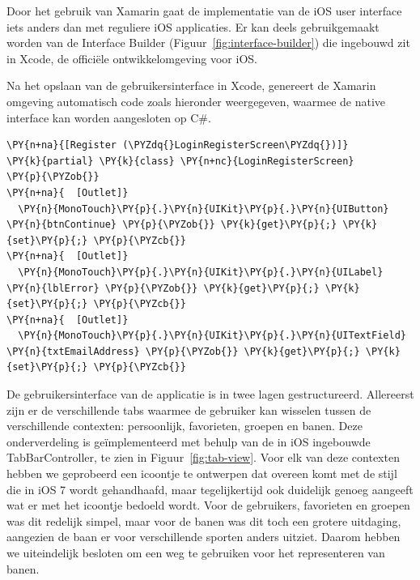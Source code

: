 Door het gebruik van Xamarin gaat de implementatie van de iOS user interface iets anders dan met reguliere iOS applicaties. Er kan deels gebruikgemaakt worden van de Interface Builder (Figuur~\ref{fig:interface-builder}) die ingebouwd zit in Xcode, de officiële ontwikkelomgeving voor iOS.

Na het opslaan van de gebruikersinterface in Xcode, genereert de Xamarin omgeving automatisch code zoals hieronder weergegeven, waarmee de native interface kan worden aangesloten op C\#.



\begin{Verbatim}[commandchars=\\\{\}]
\PY{n+na}{[Register (\PYZdq{}LoginRegisterScreen\PYZdq{})]}
\PY{k}{partial} \PY{k}{class} \PY{n+nc}{LoginRegisterScreen}
\PY{p}{\PYZob{}}
\PY{n+na}{  [Outlet]}
  \PY{n}{MonoTouch}\PY{p}{.}\PY{n}{UIKit}\PY{p}{.}\PY{n}{UIButton} \PY{n}{btnContinue} \PY{p}{\PYZob{}} \PY{k}{get}\PY{p}{;} \PY{k}{set}\PY{p}{;} \PY{p}{\PYZcb{}}
\PY{n+na}{  [Outlet]}
  \PY{n}{MonoTouch}\PY{p}{.}\PY{n}{UIKit}\PY{p}{.}\PY{n}{UILabel} \PY{n}{lblError} \PY{p}{\PYZob{}} \PY{k}{get}\PY{p}{;} \PY{k}{set}\PY{p}{;} \PY{p}{\PYZcb{}}
\PY{n+na}{  [Outlet]}
  \PY{n}{MonoTouch}\PY{p}{.}\PY{n}{UIKit}\PY{p}{.}\PY{n}{UITextField} \PY{n}{txtEmailAddress} \PY{p}{\PYZob{}} \PY{k}{get}\PY{p}{;} \PY{k}{set}\PY{p}{;} \PY{p}{\PYZcb{}}
\end{Verbatim}

De gebruikersinterface van de applicatie is in twee lagen gestructureerd. Allereerst zijn er de verschillende tabs waarmee de gebruiker kan wisselen tussen de verschillende contexten: persoonlijk, favorieten, groepen en banen. Deze onderverdeling is geïmplementeerd met behulp van de in iOS ingebouwde TabBarController, te zien in Figuur~\ref{fig:tab-view}. Voor elk van deze contexten hebben we geprobeerd een icoontje te ontwerpen dat overeen komt met de stijl die in iOS 7 wordt gehandhaafd, maar tegelijkertijd ook duidelijk genoeg aangeeft wat er met het icoontje bedoeld wordt. Voor de gebruikers, favorieten en groepen was dit redelijk simpel, maar voor de banen was dit toch een grotere uitdaging, aangezien de baan er voor verschillende sporten anders uitziet. Daarom hebben we uiteindelijk besloten om een weg te gebruiken voor het representeren van banen.

